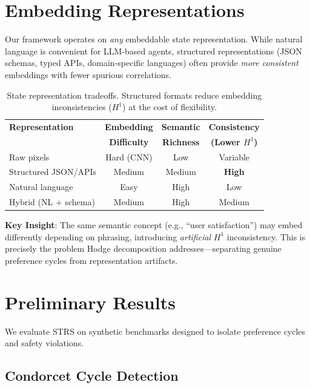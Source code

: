 \documentclass{article}
\begin{document}
\section{Embedding Representations}

Our framework operates on \emph{any} embeddable state representation. While natural language is convenient for LLM-based agents, structured representations (JSON schemas, typed APIs, domain-specific languages) often provide \emph{more consistent} embeddings with fewer spurious correlations.

\begin{table}[H]
    \centering
    \begin{tabular}{lccc}
        \toprule
        \textbf{Representation} & \textbf{Embedding} & \textbf{Semantic} & \textbf{Consistency} \\
        & \textbf{Difficulty} & \textbf{Richness} & \textbf{(Lower $H^1$)} \\
        \midrule
        Raw pixels & Hard (CNN) & Low & Variable \\
        Structured JSON/APIs & Medium & Medium & \textbf{High} \\
        Natural language & Easy & High & Low \\
        Hybrid (NL + schema) & Medium & High & Medium \\
        \bottomrule
    \end{tabular}
    \caption{State representation tradeoffs. Structured formats reduce embedding inconsistencies ($H^1$) at the cost of flexibility.}
    \label{tab:representations}
\end{table}

\textbf{Key Insight}: The same semantic concept (e.g., ``user satisfaction'') may embed differently depending on phrasing, introducing \emph{artificial} $H^1$ inconsistency. This is precisely the problem Hodge decomposition addresses---separating genuine preference cycles from representation artifacts.

\section{Preliminary Results}

We evaluate STRS on synthetic benchmarks designed to isolate preference cycles and safety violations.

\subsection{Condorcet Cycle Detection}
\end{document}
